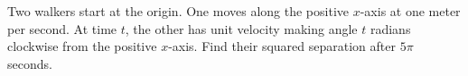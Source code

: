 Two walkers start at the origin. One moves along the positive $x$-axis at one meter per second. At time $t$, the other has unit velocity making angle $t$ radians clockwise from the positive $x$-axis. Find their squared separation after $5\pi$ seconds.
